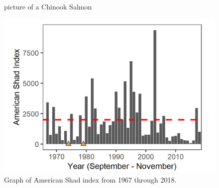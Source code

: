 \documentclass[
]{book}
\begin{document}
\begin{panel-grid}
\begin{columns-nocenter}
\begin{column800}
\begin{figure}
{}

\caption{picture of a Chinook Salmon}\label{fig:unnamed-chunk-129}
\end{figure}

\end{column800}

\end{columns-nocenter}

\begin{columns-nocenter}

\begin{column800}

\begin{expand}

\begin{figure}
\includegraphics[width=15.25in]{figures/FMWT_AS_1966} \caption{Graph of American Shad index from 1967 through 2018.}\label{fig:unnamed-chunk-130}
\end{figure}

\end{expand}

\end{column800}

\begin{column40}

~

\end{column40}

\begin{column800}

\begin{expand}


\end{expand}
\end{column800}
\end{columns-nocenter}
\end{panel-grid}
\end{document}
